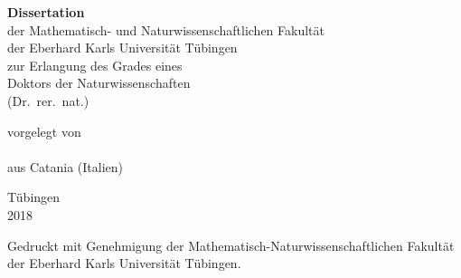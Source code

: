 \begin{titlepage}
\makeatletter %
\setlength{\parskip}{0pt}
\centering
\large
%
\linespread{1.5}
\sffamily
\slshape
\selectfont

\vspace*{-2cm}

{\huge \bfseries
  \@title%
  \par%
}

\vspace{4cm}

{\bfseries Dissertation}\\
der Mathematisch- und Naturwissenschaftlichen Fakult\"at\\
der Eberhard Karls Universit\"at T\"ubingen\\
zur Erlangung des Grades eines\\
Doktors der Naturwissenschaften\\
(Dr.\ rer.\ nat.)

\vspace{4 cm}

vorgelegt von \\
\@author \\
aus Catania (Italien)

\vspace{2 cm}

T\"ubingen\\
2018

\vfill
\end{titlepage}
\clearpage
\thispagestyle{empty}
%
\vspace*{\fill}

Gedruckt mit Genehmigung der Mathematisch-Naturwissenschaftlichen Fakultät der
Eberhard Karls Universität Tübingen.


